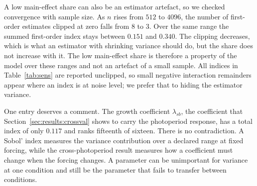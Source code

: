 A low main-effect share can also be an estimator artefact, so we checked
convergence with sample size. As $n$ rises from $512$ to $4096$, the number of
first-order estimates clipped at zero falls from $8$ to $3$. Over the same
range the summed first-order index stays between $0.151$ and $0.340$. The
clipping decreases, which is what an
estimator with shrinking variance should do, but the share does not increase
with it. The low main-effect share is therefore a property of the model over
these ranges and not an artefact of a small sample. All indices in
Table~\ref{tab:sens} are reported unclipped, so small negative interaction
remainders appear where an index is at noise level; we prefer that to hiding
the estimator variance.

One entry deserves a comment. The growth coefficient $\lambda_{sb}$, the
coefficient that Section~\ref{sec:results:crossval} shows to carry the
photoperiod response, has a total index of only $0.117$ and ranks fifteenth of
sixteen. There is no contradiction. A Sobol' index measures the variance
contribution over a declared range at fixed forcing, while the
cross-photoperiod result measures how a coefficient must change when the
forcing changes. A parameter can be unimportant for variance at one condition
and still be the parameter that fails to transfer between conditions.

